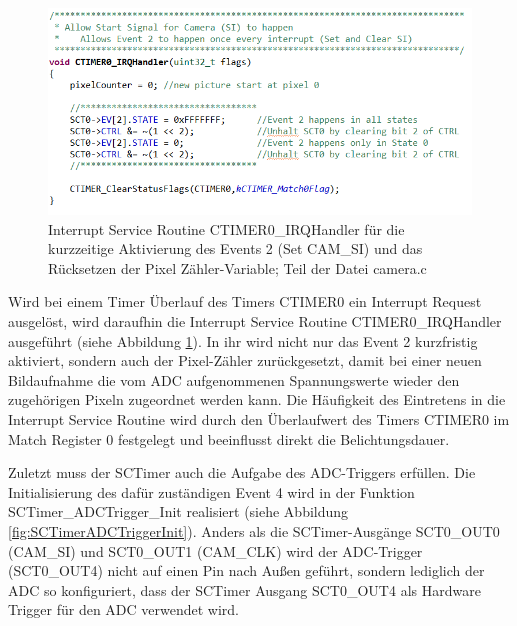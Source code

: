 
\begin{figure}[H] %
\includegraphics[width=.95\textwidth]{sec7/images/code/CTIMER0IRQHandler} 
\centering
\captionsetup{width=.95\textwidth}
\caption[Interrupt Service Routine \glqq{}CTIMER0\_IRQHandler\grqq{} aus der Datei \glqq{}camera.c\grqq{}]{Interrupt Service Routine \glqq{}CTIMER0\_IRQHandler\grqq{} für die kurzzeitige Aktivierung des Events 2 (Set CAM\_SI) und das Rücksetzen der Pixel Zähler-Variable; Teil der Datei \glqq{}camera.c\grqq{}}\centering
\label{fig:CTIMER0IRQHandler}
\end{figure}

Wird bei einem Timer Überlauf des Timers CTIMER0 ein Interrupt Request ausgelöst, wird daraufhin die Interrupt Service Routine \glqq{}CTIMER0\_IRQHandler\grqq{} ausgeführt (siehe Abbildung \ref{fig:CTIMER0IRQHandler}). In ihr wird nicht nur das Event 2 kurzfristig aktiviert, sondern auch der Pixel-Zähler zurückgesetzt, damit bei einer neuen Bildaufnahme die vom ADC aufgenommenen Spannungswerte wieder den zugehörigen Pixeln zugeordnet werden kann. Die Häufigkeit des Eintretens in die Interrupt Service Routine wird durch den Überlaufwert des Timers CTIMER0 im Match Register 0 festgelegt und beeinflusst direkt die Belichtungsdauer.\vspace{11pt}



Zuletzt muss der SCTimer auch die Aufgabe des ADC-Triggers erfüllen. Die Initialisierung des dafür zuständigen Event 4 wird in der Funktion \glqq{}SCTimer\_ADCTrigger\_Init\grqq{} realisiert (siehe Abbildung \ref{fig:SCTimerADCTriggerInit}). Anders als die SCTimer-Ausgänge SCT0\_OUT0 (CAM\_SI) und SCT0\_OUT1 (CAM\_CLK) wird der ADC-Trigger (SCT0\_OUT4) nicht auf einen Pin nach Außen geführt, sondern lediglich der ADC so konfiguriert, dass der SCTimer Ausgang SCT0\_OUT4 als Hardware Trigger für den ADC verwendet wird.

